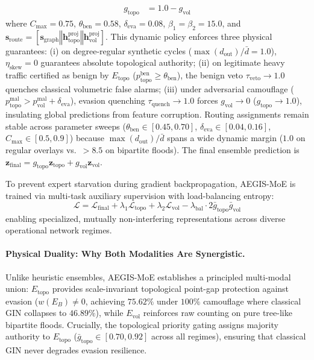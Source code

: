 \documentclass[10pt,twocolumn,letterpaper]{article}
\begin{document}
\begin{enumerate}
\begin{align}
    g_{\text{topo}} &= 1.0 - g_{\text{vol}}
    \end{align}
    where $C_{\text{max}} = 0.75$, $\theta_{\text{ben}} = 0.58$, $\delta_{\text{eva}} = 0.08$, $\beta_1 = \beta_2 = 15.0$, and $\mathbf{s}_{\text{route}} = [\mathbf{s}_{\text{graph}} \mathbin{\Vert} \mathbf{h}_{\text{topo}}^{\text{proj}} \mathbin{\Vert} \mathbf{h}_{\text{vol}}^{\text{proj}}]$. This dynamic policy enforces three physical guarantees: (i) on degree-regular synthetic cycles ($\max(d_{\text{out}})/\bar{d} = 1.0$), $\eta_{\text{skew}} = 0$ guarantees absolute topological authority; (ii) on legitimate heavy traffic certified as benign by $E_{\text{topo}}$ ($p_{\text{topo}}^{\text{ben}} \ge \theta_{\text{ben}}$), the benign veto $\tau_{\text{veto}} \to 1.0$ quenches classical volumetric false alarms; (iii) under adversarial camouflage ($p_{\text{topo}}^{\text{mal}} > p_{\text{vol}}^{\text{mal}} + \delta_{\text{eva}}$), evasion quenching $\tau_{\text{quench}} \to 1.0$ forces $g_{\text{vol}} \to 0$ ($g_{\text{topo}} \to 1.0$), insulating global predictions from feature corruption. Routing assignments remain stable across parameter sweeps ($\theta_{\text{ben}} \in [0.45, 0.70]$, $\delta_{\text{eva}} \in [0.04, 0.16]$, $C_{\text{max}} \in [0.5, 0.9]$) because $\max(d_{\text{out}})/\bar{d}$ spans a wide dynamic margin ($1.0$ on regular overlays vs.\ $>8.5$ on bipartite floods). The final ensemble prediction is $\mathbf{z}_{\text{final}} = g_{\text{topo}} \mathbf{z}_{\text{topo}} + g_{\text{vol}} \mathbf{z}_{\text{vol}}$.
\end{enumerate}
To prevent expert starvation during gradient backpropagation, AEGIS-MoE is trained via multi-task auxiliary supervision with load-balancing entropy:
\begin{equation}
\mathcal{L} = \mathcal{L}_{\text{final}} + \lambda_1 \mathcal{L}_{\text{topo}} + \lambda_2 \mathcal{L}_{\text{vol}} - \lambda_{\text{bal}} \cdot 2 \bar{g}_{\text{topo}} \bar{g}_{\text{vol}}
\end{equation}
enabling specialized, mutually non-interfering representations across diverse operational network regimes.

\paragraph{Physical Duality: Why Both Modalities Are Synergistic.}
Unlike heuristic ensembles, AEGIS-MoE establishes a principled multi-modal union: $E_{\text{topo}}$ provides scale-invariant topological point-gap protection against evasion ($w(E_B) \ne 0$, achieving $75.62\%$ under $100\%$ camouflage where classical GIN collapses to $46.89\%$), while $E_{\text{vol}}$ reinforces raw counting on pure tree-like bipartite floods. Crucially, the topological priority gating assigns majority authority to $E_{\text{topo}}$ ($\bar{g}_{\text{topo}} \in [0.70, 0.92]$ across all regimes), ensuring that classical GIN never degrades evasion resilience.
\end{document}
